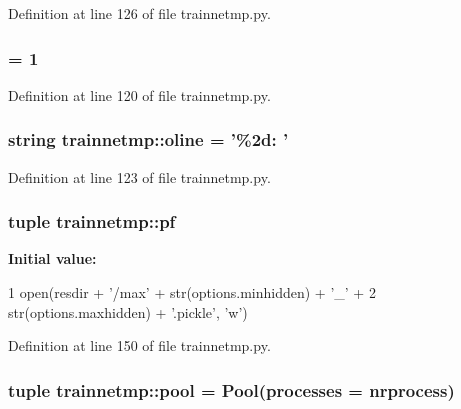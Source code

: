 Definition at line 126 of file trainnetmp.py.

\hypertarget{namespacetrainnetmp_a645db8b07923a52025222af462801dc2}{
\subsubsection[{oldj}]{ = 1}}
\label{namespacetrainnetmp_a645db8b07923a52025222af462801dc2}


Definition at line 120 of file trainnetmp.py.

\hypertarget{namespacetrainnetmp_a0fc6d0db466612f63fa6df1c682394d0}{
\subsubsection[{oline}]{\setlength{\rightskip}{0pt plus 5cm}string {\bf trainnetmp::oline} = '\%2d: '}}
\label{namespacetrainnetmp_a0fc6d0db466612f63fa6df1c682394d0}


Definition at line 123 of file trainnetmp.py.

\hypertarget{namespacetrainnetmp_a6b1fd4837c9650e7f0526c5e9b88fc05}{
\subsubsection[{pf}]{\setlength{\rightskip}{0pt plus 5cm}tuple {\bf trainnetmp::pf}}}
\label{namespacetrainnetmp_a6b1fd4837c9650e7f0526c5e9b88fc05}
{\bfseries Initial value:}
\begin{DoxyCode}
1 open(resdir + '/max' + str(options.minhidden) + '_' + 
2                       str(options.maxhidden) + '.pickle', 'w')
\end{DoxyCode}


Definition at line 150 of file trainnetmp.py.

\hypertarget{namespacetrainnetmp_a03c784c70244aab9be7a7f087f99f1e8}{
\subsubsection[{pool}]{\setlength{\rightskip}{0pt plus 5cm}tuple {\bf trainnetmp::pool} = Pool(processes = {\bf nrprocess})}}
\label{namespacetrainnetmp_a03c784c70244aab9be7a7f087f99f1e8}


